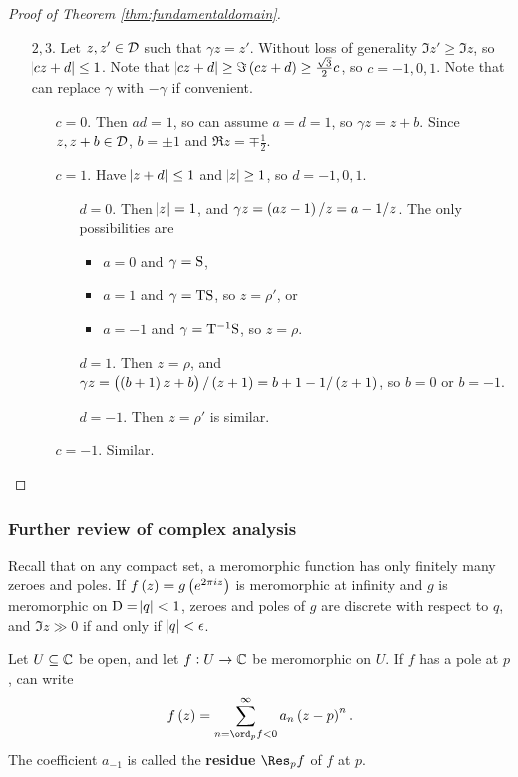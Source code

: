 \begin{proof}[Proof of Theorem \ref{thm:fundamentaldomain}]
\begin{enumerate}
\item[$ 2, 3 $.] Let $ z, z' \in \DDD $ such that $ \gamma z = z' $. Without loss of generality $ \Im z' \ge \Im z $, so $ \abs{cz + d} \le 1 $. Note that $ \abs{cz + d} \ge \Im \br{cz + d} \ge \tfrac{\sqrt{3}}{2}c $, so $ c = -1, 0, 1 $. Note that can replace $ \gamma $ with $ -\gamma $ if convenient.
\begin{itemize}
\item[$ c = 0 $.] Then $ ad = 1 $, so can assume $ a = d = 1 $, so $ \gamma z = z + b $.
Since $ z, z + b \in \DDD $, $ b = \pm 1 $ and $ \Re z = \mp\tfrac{1}{2} $.
\item[$ c = 1 $.] Have $ \abs{z + d} \le 1 $ and $ \abs{z} \ge 1 $, so $ d = -1, 0, 1 $.
\begin{itemize}
\item[$ d = 0 $.] Then $ \abs{z} = 1 $, and $ \gamma z = \br{az - 1} / z = a - 1 / z $.
The only possibilities are
\begin{itemize}
\item $ a = 0 $ and $ \gamma = \S $,
\item $ a = 1 $ and $ \gamma = \T\S $, so $ z = \rho' $, or
\item $ a = -1 $ and $ \gamma = \T^{-1}\S $, so $ z = \rho $.
\end{itemize}
\item[$ d = 1 $.] Then $ z = \rho $, and $ \gamma z = \br{\br{b + 1}z + b} / \br{z + 1} = b + 1 - 1 / \br{z + 1} $, so $ b = 0 $ or $ b = -1 $.
\item[$ d = -1 $.] Then $ z = \rho' $ is similar.
\end{itemize}
\item[$ c = -1 $.] Similar.
\end{itemize}
\end{enumerate}
\end{proof}

\subsubsection{Further review of complex analysis}

Recall that on any compact set, a meromorphic function has only finitely many zeroes and poles. If $ f\br{z} = g\br{e^{2\pi i z}} $ is meromorphic at infinity and $ g $ is meromorphic on $ \D = \abs{q} < 1 $, zeroes and poles of $ g $ are discrete with respect to $ q $, and $ \Im z \gg 0 $ if and only if $ \abs{q} < \epsilon $.

\begin{definition}
Let $ U \subseteq \CC $ be open, and let $ f : U \to \CC $ be meromorphic on $ U $. If $ f $ has a pole at $ p $, can write
$$ f\br{z} = \sum_{n = \ord_p f < 0}^\infty a_n\br{z - p}^n. $$
The coefficient $ a_{-1} $ is called the \textbf{residue} $ \Res_p f $ of $ f $ at $ p $.
\end{definition}

